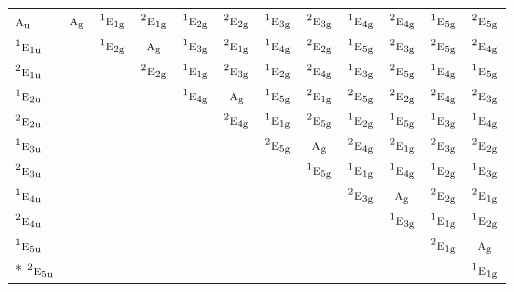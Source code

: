 \documentclass[10pt,a4paper]{article}
\numberwithin{equation}{section}
\newcommand{\irr}[1]{\text{\normalfont\scshape #1}}
\newcommand{\conjpair}[1]{{}^{#1}}
\newcommand{\ptag}[1]{\mathrm{#1}}
\begin{document}
{\begin{longtable}{@{}lccccccccccc@{}}
$\irr{a}_{\ptag{u}}$ & $\irr{a}_{\ptag{g}}$ & $\conjpair{1}\irr{e}_{1\ptag{g}}$ & $\conjpair{2}\irr{e}_{1\ptag{g}}$ & $\conjpair{1}\irr{e}_{2\ptag{g}}$ & $\conjpair{2}\irr{e}_{2\ptag{g}}$ & $\conjpair{1}\irr{e}_{3\ptag{g}}$ & $\conjpair{2}\irr{e}_{3\ptag{g}}$ & $\conjpair{1}\irr{e}_{4\ptag{g}}$ & $\conjpair{2}\irr{e}_{4\ptag{g}}$ & $\conjpair{1}\irr{e}_{5\ptag{g}}$ & $\conjpair{2}\irr{e}_{5\ptag{g}}$\\
$\conjpair{1}\irr{e}_{1\ptag{u}}$ &  & $\conjpair{1}\irr{e}_{2\ptag{g}}$ & $\irr{a}_{\ptag{g}}$ & $\conjpair{1}\irr{e}_{3\ptag{g}}$ & $\conjpair{2}\irr{e}_{1\ptag{g}}$ & $\conjpair{1}\irr{e}_{4\ptag{g}}$ & $\conjpair{2}\irr{e}_{2\ptag{g}}$ & $\conjpair{1}\irr{e}_{5\ptag{g}}$ & $\conjpair{2}\irr{e}_{3\ptag{g}}$ & $\conjpair{2}\irr{e}_{5\ptag{g}}$ & $\conjpair{2}\irr{e}_{4\ptag{g}}$\\
$\conjpair{2}\irr{e}_{1\ptag{u}}$ &  &  & $\conjpair{2}\irr{e}_{2\ptag{g}}$ & $\conjpair{1}\irr{e}_{1\ptag{g}}$ & $\conjpair{2}\irr{e}_{3\ptag{g}}$ & $\conjpair{1}\irr{e}_{2\ptag{g}}$ & $\conjpair{2}\irr{e}_{4\ptag{g}}$ & $\conjpair{1}\irr{e}_{3\ptag{g}}$ & $\conjpair{2}\irr{e}_{5\ptag{g}}$ & $\conjpair{1}\irr{e}_{4\ptag{g}}$ & $\conjpair{1}\irr{e}_{5\ptag{g}}$\\
$\conjpair{1}\irr{e}_{2\ptag{u}}$ &  &  &  & $\conjpair{1}\irr{e}_{4\ptag{g}}$ & $\irr{a}_{\ptag{g}}$ & $\conjpair{1}\irr{e}_{5\ptag{g}}$ & $\conjpair{2}\irr{e}_{1\ptag{g}}$ & $\conjpair{2}\irr{e}_{5\ptag{g}}$ & $\conjpair{2}\irr{e}_{2\ptag{g}}$ & $\conjpair{2}\irr{e}_{4\ptag{g}}$ & $\conjpair{2}\irr{e}_{3\ptag{g}}$\\
$\conjpair{2}\irr{e}_{2\ptag{u}}$ &  &  &  &  & $\conjpair{2}\irr{e}_{4\ptag{g}}$ & $\conjpair{1}\irr{e}_{1\ptag{g}}$ & $\conjpair{2}\irr{e}_{5\ptag{g}}$ & $\conjpair{1}\irr{e}_{2\ptag{g}}$ & $\conjpair{1}\irr{e}_{5\ptag{g}}$ & $\conjpair{1}\irr{e}_{3\ptag{g}}$ & $\conjpair{1}\irr{e}_{4\ptag{g}}$\\
$\conjpair{1}\irr{e}_{3\ptag{u}}$ &  &  &  &  &  & $\conjpair{2}\irr{e}_{5\ptag{g}}$ & $\irr{a}_{\ptag{g}}$ & $\conjpair{2}\irr{e}_{4\ptag{g}}$ & $\conjpair{2}\irr{e}_{1\ptag{g}}$ & $\conjpair{2}\irr{e}_{3\ptag{g}}$ & $\conjpair{2}\irr{e}_{2\ptag{g}}$\\
$\conjpair{2}\irr{e}_{3\ptag{u}}$ &  &  &  &  &  &  & $\conjpair{1}\irr{e}_{5\ptag{g}}$ & $\conjpair{1}\irr{e}_{1\ptag{g}}$ & $\conjpair{1}\irr{e}_{4\ptag{g}}$ & $\conjpair{1}\irr{e}_{2\ptag{g}}$ & $\conjpair{1}\irr{e}_{3\ptag{g}}$\\
$\conjpair{1}\irr{e}_{4\ptag{u}}$ &  &  &  &  &  &  &  & $\conjpair{2}\irr{e}_{3\ptag{g}}$ & $\irr{a}_{\ptag{g}}$ & $\conjpair{2}\irr{e}_{2\ptag{g}}$ & $\conjpair{2}\irr{e}_{1\ptag{g}}$\\
$\conjpair{2}\irr{e}_{4\ptag{u}}$ &  &  &  &  &  &  &  &  & $\conjpair{1}\irr{e}_{3\ptag{g}}$ & $\conjpair{1}\irr{e}_{1\ptag{g}}$ & $\conjpair{1}\irr{e}_{2\ptag{g}}$\\
$\conjpair{1}\irr{e}_{5\ptag{u}}$ &  &  &  &  &  &  &  &  &  & $\conjpair{2}\irr{e}_{1\ptag{g}}$ & $\irr{a}_{\ptag{g}}$\\*
$\conjpair{2}\irr{e}_{5\ptag{u}}$ &  &  &  &  &  &  &  &  &  &  & $\conjpair{1}\irr{e}_{1\ptag{g}}$\\
\bottomrule\end{longtable}}
\end{document}
